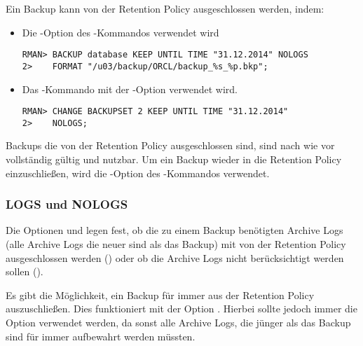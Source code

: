         Ein Backup kann von der Retention Policy ausgeschlossen werden, indem:
        \begin{itemize}
          \item Die -Option des -Kommandos verwendet wird
            \begin{lstlisting}[caption={Ein neues Backup aus der Retention Policy ausschließen},label=admin1029,language=rman]
RMAN> BACKUP database KEEP UNTIL TIME "31.12.2014" NOLOGS
2>    FORMAT "/u03/backup/ORCL/backup_%s_%p.bkp";
            \end{lstlisting}
          \item Das -Kommando mit der -Option verwendet wird.
            \begin{lstlisting}[caption={Ein bestehendes Backup aus der Retention Policy ausschließen},label=admin1030,language=rman]
RMAN> CHANGE BACKUPSET 2 KEEP UNTIL TIME "31.12.2014"
2>    NOLOGS;
            \end{lstlisting}
        \end{itemize}
        Backups die von der Retention Policy ausgeschlossen sind, sind nach wie vor vollständig gültig und nutzbar. Um ein Backup wieder in die Retention Policy einzuschließen, wird die -Option des -Kommandos verwendet.
        \subsubsection{LOGS und NOLOGS}
          Die Optionen  und  legen fest, ob die zu einem Backup benötigten Archive Logs (alle Archive Logs die neuer sind als das Backup) mit von der Retention Policy ausgeschlossen werden () oder ob die Archive Logs nicht berücksichtigt werden sollen ().

          Es gibt die Möglichkeit, ein Backup für immer aus der Retention Policy auszuschließen. Dies funktioniert mit der Option . Hierbei sollte jedoch immer die Option  verwendet werden, da sonst alle Archive Logs, die jünger als das Backup sind für immer aufbewahrt werden müssten.
